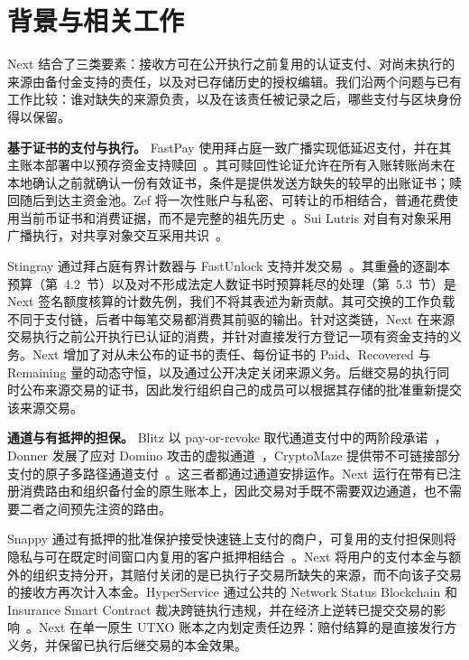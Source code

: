 \section{背景与相关工作}
\label{sec:related}

Next 结合了三类要素：接收方可在公开执行之前复用的认证支付、对尚未执行的来源由备付金支持的责任，以及对已存储历史的授权编辑。我们沿两个问题与已有工作比较：谁对缺失的来源负责，以及在该责任被记录之后，哪些支付与区块身份得以保留。

\noindent\textbf{基于证书的支付与执行。}
FastPay 使用拜占庭一致广播实现低延迟支付，并在其主账本部署中以预存资金支持赎回~\cite{fastpay}。其可赎回性论证允许在所有入账转账尚未在本地确认之前就确认一份有效证书，条件是提供发送方缺失的较早的出账证书；赎回随后到达主资金池。Zef 将一次性账户与私密、可转让的币相结合，普通花费使用当前币证书和消费证据，而不是完整的祖先历史~\cite{zef}。Sui Lutris 对自有对象采用广播执行，对共享对象交互采用共识~\cite{lutris}。

Stingray 通过拜占庭有界计数器与 FastUnlock 支持并发交易~\cite{stingray}。其重叠的逐副本预算（第~4.2~节）以及对不形成法定人数证书时预算耗尽的处理（第~5.3~节）是 Next 签名额度核算的计数先例，我们不将其表述为新贡献。其可交换的工作负载不同于支付链，后者中每笔交易都消费其前驱的输出。针对这类链，Next 在来源交易执行之前公开执行已认证的消费，并针对直接发行方登记一项有资金支持的义务。Next 增加了对从未公布的证书的责任、每份证书的 Paid、Recovered 与 Remaining 量的动态守恒，以及通过公开决定关闭来源义务。后继交易的执行同时公布来源交易的证书，因此发行组织自己的成员可以根据其存储的批准重新提交该来源交易。

\noindent\textbf{通道与有抵押的担保。}
Blitz 以 pay-or-revoke 取代通道支付中的两阶段承诺~\cite{blitz}，Donner 发展了应对 Domino 攻击的虚拟通道~\cite{donner}，CryptoMaze 提供带不可链接部分支付的原子多路径通道支付~\cite{cryptomaze}。这三者都通过通道安排运作。Next 运行在带有已注册消费路由和组织备付金的原生账本上，因此交易对手既不需要双边通道，也不需要二者之间预先注资的路由。

Snappy 通过有抵押的批准保护接受快速链上支付的商户，可复用的支付担保则将隐私与可在既定时间窗口内复用的客户抵押相结合~\cite{snappy,reusable}。Next 将用户的支付本金与额外的组织支持分开，其赔付关闭的是已执行子交易所缺失的来源，而不向该子交易的接收方再次计入本金。HyperService 通过公共的 Network Status Blockchain 和 Insurance Smart Contract 裁决跨链执行违规，并在经济上逆转已提交交易的影响~\cite{web3}。Next 在单一原生 UTXO 账本之内划定责任边界：赔付结算的是直接发行方义务，并保留已执行后继交易的本金效果。

